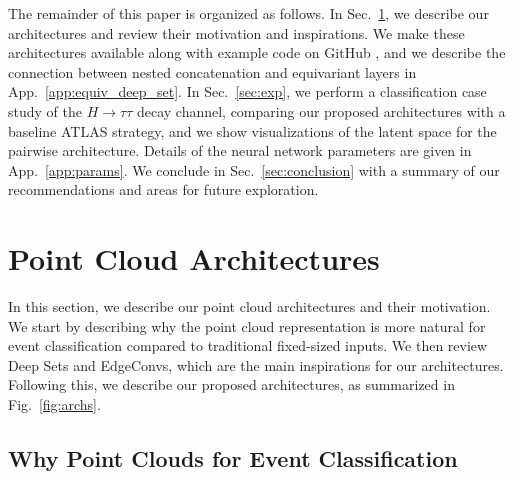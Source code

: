 \documentclass[aps,prd,twocolumn,superscriptaddress,floatfix,longbibliography,preprintnumbers,nofootinbib]{revtex4-1} %
\DeclareRobustCommand{\Sec}[1]{Sec.~\ref{sec:#1}}
\DeclareRobustCommand{\App}[1]{App.~\ref{app:#1}}
\DeclareRobustCommand{\Fig}[1]{Fig.~\ref{fig:#1}}
\newcounter{para}
\begin{document}
The remainder of this paper is organized as follows.
%
In \Sec{archs}, we describe our architectures and review their motivation and inspirations.
%
We make these architectures available along with example code on GitHub \cite{Shen2022}, and we describe the connection between nested concatenation and equivariant layers in \App{equiv_deep_set}.
%
In \Sec{exp}, we perform a classification case study of the $H\rightarrow\tau\tau$ decay channel, comparing our proposed architectures with a baseline ATLAS strategy, and we show visualizations of the latent space for the pairwise architecture.
%
Details of the neural network parameters are given in \App{params}.
%
We conclude in \Sec{conclusion} with a summary of our recommendations and areas for future exploration.



\section{Point Cloud Architectures}
\label{sec:archs}


In this section, we describe our point cloud architectures and their motivation.
%
We start by describing why the point cloud representation is more natural for event classification compared to traditional fixed-sized inputs.
%
We then review Deep Sets and EdgeConvs, which are the main inspirations for our architectures.
%
Following this, we describe our proposed architectures, as summarized in \Fig{archs}.



\subsection{Why Point Clouds for Event Classification}
\label{sec:why}
\end{document}
